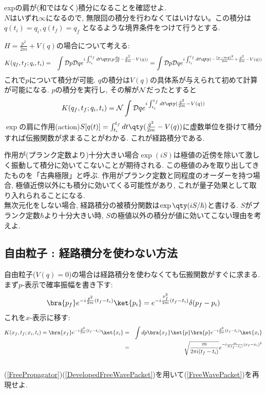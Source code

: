 \documentclass[10.5pt,a4paper]{jreport}
\begin{document}
 expの肩が(和ではなく)積分になることを確認せよ.\\

$N$はいずれ$\infty$になるので, 無限回の積分を行わなくてはいけない。この積分は $q(t_i) = q_i, q(t_f) = q_f$ となるような境界条件をつけて行うとする.

$H = \frac{p^2}{2m} + V(q)$の場合について考える:
\begin{eqnarray}
  K(q_f, t_f;q_i, t_i) &=& \int {\cal D}p{\cal D}qe^{i\int_{t_i}^{t_f}dt\qty(p\frac{dq}{dt} - \frac{p^2}{2m} - V(q))} = \int {\cal D}p{\cal D}qe^{i\int_{t_i}^{t_f}dt\qty(-\frac{(p-m\dot{q})^2}{2m} + \frac{\dot{q}^2}{2m} - V(q))}
\end{eqnarray}
これで$p$について積分が可能. $q$の積分は$V(q)$の具体系が与えられて初めて計算が可能になる. $p$の積分を実行し, その解が${\cal N}$だったとすると
\begin{eqnarray}
  K(q_f, t_f;q_i, t_i) = {\cal N}\int {\cal D}qe^{i\int_{t_i}^{t_f}dt\qty(\frac{\dot{q}^2}{2m} - V(q))}\label{FeynmanPropagator}
\end{eqnarray}
$\exp$の肩に作用(action)$S[q(t)] = \int_{t_i}^{t_f}dt\qty(\frac{\dot{q}^2}{2m} - V(q))$に虚数単位を掛けて積分すれば伝搬関数が求まることがわかる. これが経路積分である.

作用が(プランク定数より)十分大きい場合$\exp(iS)$は極値の近傍を除いて激しく振動して積分に効いてこないことが期待される. この極値のみを取り出してきたものを「古典極限」と呼ぶ. 作用がプランク定数と同程度のオーダーを持つ場合, 極値近傍以外にも積分に効いてくる可能性があり, これが量子効果として取り入れられることになる.\\

 無次元化をしない場合, 経路積分の被積分関数は$\exp\qty(iS/\hbar)$と書ける. $S$がプランク定数$\hbar$より十分大きい時, $S$の極値以外の積分が値に効いてこない理由を考えよ. 

\subsection{自由粒子 : 経路積分を使わない方法}
自由粒子($V(q) = 0$)の場合は経路積分を使わなくても伝搬関数がすぐに求まる. まず$p$-表示で確率振幅を書き下す:
\begin{eqnarray}
  \bra{p_f}e^{-i\frac{\hat{p}^2}{2m}(t_f - t_i)}\ket{p_i} = e^{-i\frac{p_f^2}{2m}(t_f - t_i)}\delta(p_f - p_i)
\end{eqnarray}
これを$x$-表示に移す:
\begin{eqnarray}
  K(x_f, t_f;x_i, t_i) = \bra{x_f}e^{-i\frac{\hat{p}^2}{2m}(t_f - t_i)}\ket{x_i} &=& \int dp\bra{x_f}\ket{p}\bra{p}e^{-i\frac{\hat{p}^2}{2m}(t_f - t_i)}\ket{x_i}\\
  &=&\sqrt{\frac{m}{2\pi i(t_f-t_i)}}e^{-i\frac{m}{2(t_f - t_i)}(x_f - x_i)^2}\label{FreePropagator}
\end{eqnarray}\\
 (\ref{FreePropagator})(\ref{DevelopedFreeWavePacket})を用いて(\ref{FreeWavePacket})を再現せよ.
\end{document}
